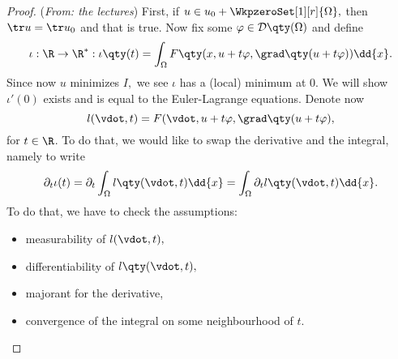 \begin{proof}(\textit{From: the lectures})
	First, if $u \in u_0 + \WkpzeroSet[1][r]{\Omega},$ then $\tr u = \tr u_0$ and that is true. Now fix some $\varphi \in \mathcal{D}\qty(\Omega)$ and define
	\[
		\iota: \R \to \R^{*}: \iota\qty(t) = \int_{\Omega}F\qty(x, u + t \varphi, \grad\qty(u+ t \varphi))\dd{x}.
	\]
	Since now $u$ minimizes $I,$ we see $\iota$ has a (local) minimum at $0.$ We will show $\iota'(0)$ exists and is equal to the Euler-Lagrange equations. 
	Denote now
	\[
		l(\vdot, t) = F(\vdot, u + t \varphi, \grad \qty(u + t \varphi),
	\]
	for $t \in \R$. To do that, we would like to swap the derivative and the integral, namely to write
	\[
		\partial_t \iota(t)  = \partial_t \int_{\Omega}l\qty(\vdot, t)\dd{x} = \int_{\Omega}\partial_t l\qty(\vdot, t)\dd{x}.
	\]
	To do that, we have to check the assumptions: 
	\begin{itemize}
		\item measurability of $l(\vdot,t),$
		\item differentiability of $l\qty(\vdot,t),$
		\item majorant for the derivative,
		\item convergence of the integral on some neighbourhood of $t$.
	\end{itemize}


\end{proof}
